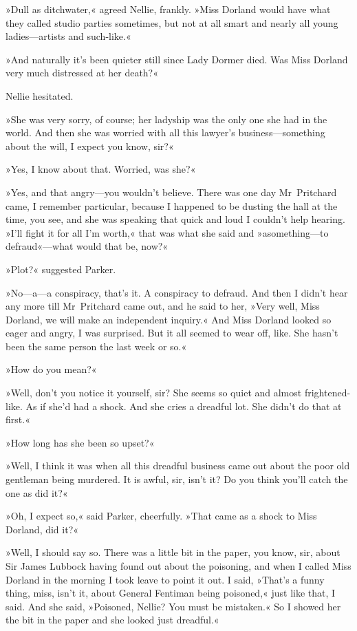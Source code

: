 »Dull as ditchwater,« agreed Nellie, frankly. »Miss Dorland would have what they called studio parties sometimes, but not at all smart and nearly all young ladies—artists and such-like.«

»And naturally it's been quieter still since Lady Dormer died. Was Miss Dorland very much distressed at her death?«

Nellie hesitated.

»She was very sorry, of course; her ladyship was the only one she had in the world. And then she was worried with all this lawyer's business—something about the will, I expect you know, sir?«

»Yes, I know about that. Worried, was she?«

»Yes, and that angry—you wouldn't believe. There was one day Mr~Pritchard came, I remember particular, because I happened to be dusting the hall at the time, you see, and she was speaking that quick and loud I couldn't help hearing. »I'll fight it for all I'm worth,« that was what she said and »a\textellipsis  something—to defraud«—what would that be, now?«

»Plot?« suggested Parker.

»No—a—a conspiracy, that's it. A conspiracy to defraud. And then I didn't hear any more till Mr~Pritchard came out, and he said to her, »Very well, Miss Dorland, we will make an independent inquiry.« And Miss Dorland looked so eager and angry, I was surprised. But it all seemed to wear off, like. She hasn't been the same person the last week or so.«

»How do you mean?«

»Well, don't you notice it yourself, sir? She seems so quiet and almost frightened-like. As if she'd had a shock. And she cries a dreadful lot. She didn't do that at first.«

»How long has she been so upset?«

»Well, I think it was when all this dreadful business came out about the poor old gentleman being murdered. It is awful, sir, isn't it? Do you think you'll catch the one as did it?«

»Oh, I expect so,« said Parker, cheerfully. »That came as a shock to Miss Dorland, did it?«

»Well, I should say so. There was a little bit in the paper, you know, sir, about Sir James Lubbock having found out about the poisoning, and when I called Miss Dorland in the morning I took leave to point it out. I said, »That's a funny thing, miss, isn't it, about General Fentiman being poisoned,« just like that, I said. And she said, »Poisoned, Nellie? You must be mistaken.« So I showed her the bit in the paper and she looked just dreadful.«

